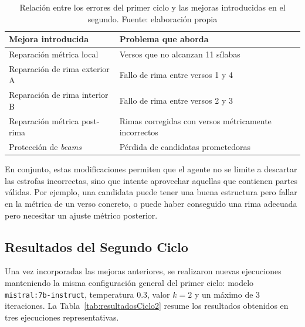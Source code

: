 \documentclass[12pt,a4paper,twoside,openright]{book}
\begin{document}
\begin{table}[h]
    \centering
    \begin{tabular}{|l|l|}
        \hline
        \textbf{Mejora introducida} & \textbf{Problema que aborda} \\
        \hline
        Reparación métrica local & Versos que no alcanzan 11 sílabas \\
        \hline
        Reparación de rima exterior A & Fallo de rima entre versos 1 y 4 \\
        \hline
        Reparación de rima interior B & Fallo de rima entre versos 2 y 3 \\
        \hline
        Reparación métrica post-rima & Rimas corregidas con versos métricamente incorrectos \\
        \hline
        Protección de \emph{beams} & Pérdida de candidatas prometedoras \\
        \hline
    \end{tabular}
    \caption{Relación entre los errores del primer ciclo y las mejoras introducidas en el segundo. Fuente: elaboración propia}
    \label{tab:mejorasCiclo2}
\end{table}

En conjunto, estas modificaciones permiten que el agente no se limite a descartar las estrofas incorrectas, sino que intente aprovechar aquellas que contienen partes válidas.
Por ejemplo, una candidata puede tener una buena estructura pero fallar en la métrica de un verso concreto, o puede haber conseguido una rima adecuada pero necesitar un ajuste métrico posterior.


\subsection{Resultados del Segundo Ciclo}

Una vez incorporadas las mejoras anteriores, se realizaron nuevas ejecuciones manteniendo la misma configuración general del primer ciclo: modelo \texttt{mistral:7b-instruct}, temperatura 0.3, valor $k=2$ y un máximo de 3 iteraciones.
La Tabla~\ref{tab:resultadosCiclo2} resume los resultados obtenidos en tres ejecuciones representativas.
\end{document}
